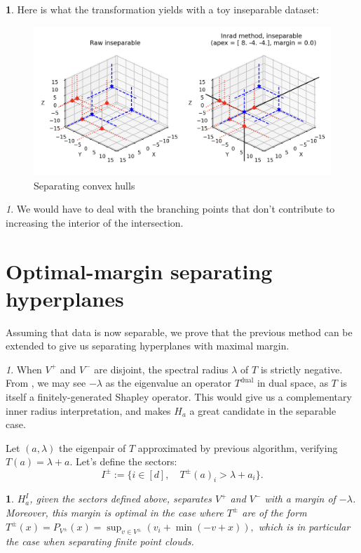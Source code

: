 \documentclass[oneside,english]{amsart}
\numberwithin{equation}{section}
\numberwithin{figure}{section}
\theoremstyle{plain}
\theoremstyle{definition}
\theoremstyle{plain}
\newtheorem{prop}[thm]{\protect\propositionname}
\theoremstyle{remark}
\newtheorem{rem}[thm]{\protect\remarkname}
\theoremstyle{plain}
\theoremstyle{definition}
\newtheorem{example}[thm]{\protect\examplename}
\theoremstyle{definition}
\providecommand{\propositionname}{Proposition}
\providecommand{\remarkname}{Remark}
\providecommand{\examplename}{Example}
\begin{document}
\begin{example}
Here is what the transformation yields with a toy inseparable dataset:

\begin{figure}[!h]
\includegraphics[scale=0.4]{fig/inseparable.png}
\caption{Separating convex hulls}
\end{figure}
\end{example}

\begin{rem}
We would have to deal with the
branching points that don't contribute to increasing the interior of the intersection. 
\end{rem}


\section{Optimal-margin separating hyperplanes}

Assuming that data is now separable, we prove that the previous
method can be extended to give us separating hyperplanes with maximal
margin.
\begin{rem}
When $V^{+}$ and $V^{-}$ are disjoint, the spectral radius $\lambda$
of $T$ is strictly negative. From \cite{AKIAN2021}, we may see
$-\lambda$ as the eigenvalue an operator $T^{\text{dual}}$
in dual space, as $T$ is itself a finitely-generated
Shapley operator. This would give us a complementary inner radius
interpretation, and makes $H_{a}$ a great candidate in the separable
case.
\end{rem}

Let $(a,\lambda)$ the eigenpair of $T$ approximated
by previous algorithm, verifying $T(a)=\lambda+a$. Let's define the sectors:
\[
I^{\pm}:=\{i\in[d],\quad T^{\pm}(a)_{i}>\lambda+a_{i}\}.
\]

\begin{prop}
$H_{a}^{I}$, given the sectors defined above, separates $V^{+}$ and
$V^{-}$ with a margin of $-\lambda$. Moreover, this margin is optimal in the case where $T^{\pm}$ are of the form $T^{\pm}(x) = P_{V^{\pm}}(x) = \sup_{v\in V^{\pm}} \left( v_i + \min (-v + x)\right),$ which is in particular the case when separating finite point clouds.
\end{prop}
\end{document}
